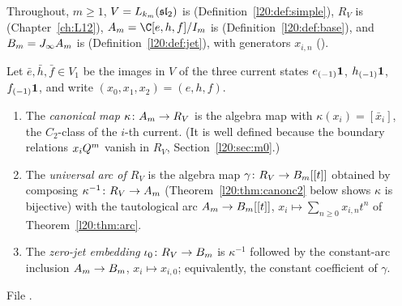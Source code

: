 Throughout, $m\ge1$, $V=L_{k_m}(\mathfrak{sl}_2)$ is  (Definition~\ref{l20:def:simple}),
$R_V$ is  (Chapter~\ref{ch:L12}), $\ltwentyA=\C[e,h,f]/I_m$ is 
(Definition~\ref{l20:def:base}), and $B_m=J_\infty A_m$ is 
(Definition~\ref{l20:def:jet}), with generators $x_{i,n}$ ().

\begin{definition}\label{l20:def:canonc2}
Let $\bar e,\bar h,\bar f\in V_1$ be the images in $V$ of the three current states $e_{(-1)}\mathbf{1}$, $h_{(-1)}\mathbf{1}$,
$f_{(-1)}\mathbf{1}$, and write $(x_0,x_1,x_2)=(e,h,f)$.
\begin{enumerate}
\item The \emph{canonical map} $\kappa\colon A_m\to R_V$ is the algebra map with $\kappa(x_i)=[\bar x_i]$, the $C_2$-class
  of the $i$-th current. (It is well defined because the boundary relations $x_iQ^m$ vanish in $R_V$,
  Section~\ref{l20:sec:m0}.)
\item The \emph{universal arc of $R_V$} is the algebra map
  $\gamma\colon R_V\to B_m[[t]]$ obtained by composing $\kappa^{-1}\colon R_V\to A_m$ (Theorem~\ref{l20:thm:canonc2}
  below shows $\kappa$ is bijective) with the tautological arc $A_m\to B_m[[t]]$,
  $x_i\mapsto\sum_{n\ge0}x_{i,n}t^n$ of Theorem~\ref{l20:thm:arc}.
\item The \emph{zero-jet embedding} $\iota_0\colon R_V\to B_m$ is $\kappa^{-1}$ followed by the constant-arc inclusion
  $A_m\to B_m$, $x_i\mapsto x_{i,0}$; equivalently, the constant coefficient of $\gamma$.
\end{enumerate}
\end{definition}
\noindent File .

